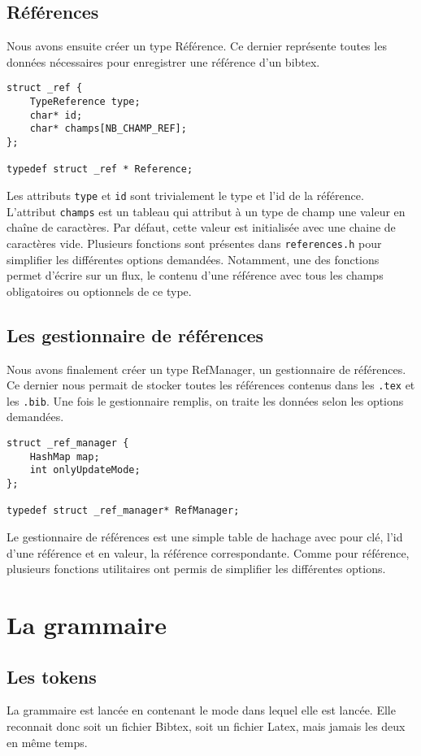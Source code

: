 \documentclass[hidelinks, a4paper,11pt,twoside,final]{article}
\begin{document}
\subsection{Références}
Nous avons ensuite créer un type Référence. Ce dernier représente toutes les données nécessaires pour enregistrer une référence d'un bibtex.
\begin{lstlisting}
struct _ref {
    TypeReference type;
    char* id;
    char* champs[NB_CHAMP_REF];
};

typedef struct _ref * Reference;
\end{lstlisting}

Les attributs \texttt{type} et \texttt{id} sont trivialement le type et l'id de la référence.
L'attribut \texttt{champs} est un tableau qui attribut à un type de champ une valeur en chaîne de caractères.
Par défaut, cette valeur est initialisée avec une chaine de caractères vide.
Plusieurs fonctions sont présentes dans \texttt{references.h} pour simplifier les différentes options demandées.
Notamment, une des fonctions permet d'écrire sur un flux, le contenu d'une référence avec tous les champs obligatoires ou optionnels de ce type.

\subsection {Les gestionnaire de références}
Nous avons finalement créer un type RefManager, un gestionnaire de références.
Ce dernier nous permait de stocker toutes les références contenus dans les \texttt{.tex} et les \texttt{.bib}. 
Une fois le gestionnaire remplis, on traite les données selon les options demandées.

\begin{lstlisting}
struct _ref_manager {
	HashMap map;
	int onlyUpdateMode;
};

typedef struct _ref_manager* RefManager;
\end{lstlisting}

Le gestionnaire de références est une simple table de hachage avec pour clé, l'id d'une référence et en valeur, la référence correspondante.
Comme pour référence, plusieurs fonctions utilitaires ont permis de simplifier les différentes options.

\section{La grammaire}
\subsection{Les tokens}
La grammaire est lancée en contenant le mode dans lequel elle est lancée. Elle reconnait donc soit un fichier Bibtex, 
soit un fichier Latex, mais jamais les deux en même temps.
\end{document}
